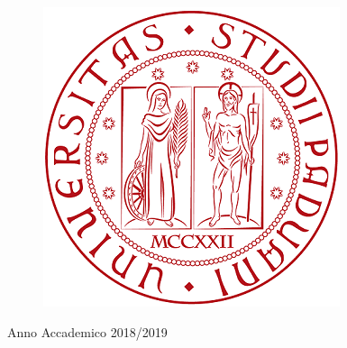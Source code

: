 \begin{titlepage}

\begin{figure}[H]
	\centering
	\includegraphics[width=0.3\linewidth]{images/unipd_logo.png}
\end{figure}

\vspace{1cm}
 

{\large Anno Accademico 2018/2019} %
\vfill %

\end{titlepage}